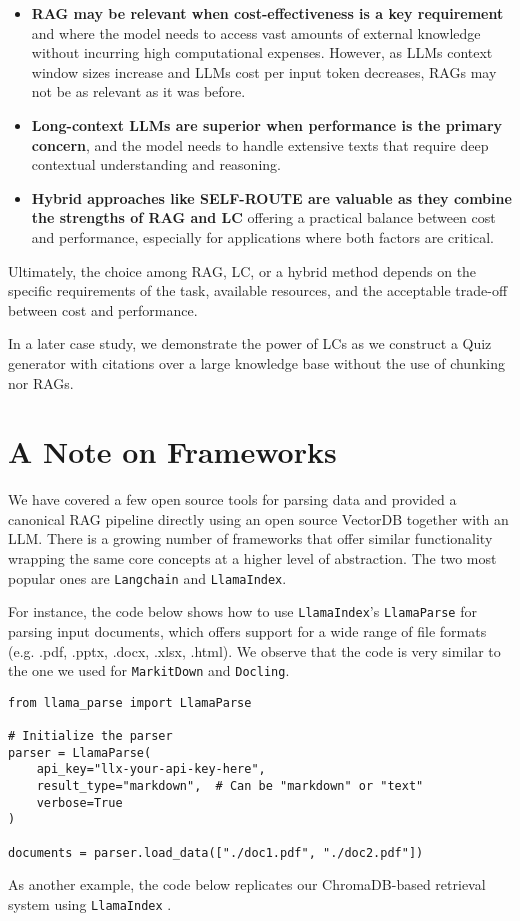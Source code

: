 \begin{itemize}
\item \textbf{RAG may be relevant when cost-effectiveness is a key requirement} and where the model needs to access vast amounts of external knowledge without incurring high computational expenses. However, as LLMs context window sizes increase and LLMs cost per input token decreases, RAGs may not be as relevant as it was before.
\item \textbf{Long-context LLMs are superior when performance is the primary concern}, and the model needs to handle extensive texts that require deep contextual understanding and reasoning.
\item \textbf{Hybrid approaches like SELF-ROUTE are valuable as they combine the strengths of RAG and LC} offering a practical balance between cost and performance, especially for applications where both factors are critical.
\end{itemize}
Ultimately, the choice among RAG, LC, or a hybrid method depends on the specific requirements of the task, available resources, and the acceptable trade-off between cost and performance.

In a later case study, we demonstrate the power of LCs as we construct a Quiz generator with citations over a large knowledge base without the use of chunking nor RAGs.

\section{A Note on Frameworks}

We have covered a few open source tools for parsing data and provided a canonical RAG pipeline directly using an open source VectorDB together with an LLM. There is a growing number of frameworks that offer similar functionality wrapping the same core concepts at a higher level of abstraction. The two most popular ones are \texttt{Langchain} and \texttt{LlamaIndex}. 

For instance, the code below shows how to use \texttt{LlamaIndex}'s \texttt{LlamaParse} for parsing input documents, which offers support for a wide range of file formats (e.g. .pdf, .pptx, .docx, .xlsx, .html). We observe that the code is very similar to the one we used for \texttt{MarkitDown} and \texttt{Docling}.

\begin{verbatim}
from llama_parse import LlamaParse

# Initialize the parser
parser = LlamaParse(
    api_key="llx-your-api-key-here",
    result_type="markdown",  # Can be "markdown" or "text"
    verbose=True
)

documents = parser.load_data(["./doc1.pdf", "./doc2.pdf"])
\end{verbatim}
As another example, the code below replicates our ChromaDB-based retrieval system using \texttt{LlamaIndex} .

